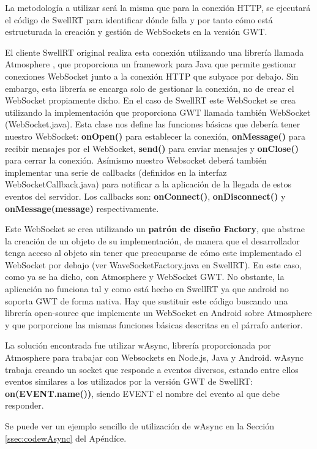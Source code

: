     La metodología a utilizar será la misma que para la conexión HTTP, se ejecutará el código de SwellRT para identificar dónde falla y por tanto cómo está estructurada la creación y gestión de WebSockets en la versión GWT.
    
    El cliente SwellRT original realiza esta conexión utilizando una librería llamada Atmosphere \cite{ref:atmosphere}, que proporciona un framework para Java que permite gestionar conexiones WebSocket junto a la conexión HTTP que subyace por debajo. Sin embargo, esta librería se encarga solo de gestionar la conexión, no de crear el WebSocket propiamente dicho. En el caso de SwellRT este WebSocket se crea utilizando la implementación que proporciona GWT llamada también WebSocket (WebSocket.java). Esta clase nos define las funciones básicas que debería tener nuestro WebSocket: \textbf{onOpen()} para establecer la conexión, \textbf{onMessage()} para recibir mensajes por el WebSocket, \textbf{send()} para enviar mensajes y \textbf{onClose()} para cerrar la conexión. Asímismo nuestro Websocket deberá también implementar una serie de callbacks (definidos en la interfaz WebSocketCallback.java) para notificar a la aplicación de la llegada de estos eventos del servidor. Los callbacks son: \textbf{onConnect()}, \textbf{onDisconnect()} y \textbf{onMessage(message)} respectivamente.
	
	Este WebSocket se crea utilizando un \textbf{patrón de diseño Factory}, que abstrae la creación de un objeto de su implementación, de manera que el desarrollador tenga acceso al objeto sin tener que preocuparse de cómo este implementado el WebSocket por debajo (ver WaveSocketFactory.java en SwellRT). En este caso, como ya se ha dicho, con Atmosphere y WebSocket GWT. No obstante, la aplicación no funciona tal y como está hecho en SwellRT ya que android no soporta GWT de forma nativa. Hay que sustituir este código buscando una librería open-source que implemente un WebSocket en Android sobre Atmosphere y que porporcione las mismas funciones básicas descritas en el párrafo anterior.
	
	La solución encontrada fue utilizar wAsync\cite{ref:wAsync_github}, librería proporcionada por Atmosphere para trabajar con Websockets en Node.js, Java y Android. wAsync trabaja creando un socket que responde a eventos diversos, estando entre ellos eventos similares a los utilizados por la versión GWT de SwellRT: \textbf{on(EVENT.name())}, siendo EVENT el nombre del evento al que debe responder. 
	
	Se puede ver un ejemplo sencillo de utilización de wAsync en la Sección \ref{ssec:codewAsync} del Apéndíce.
	
